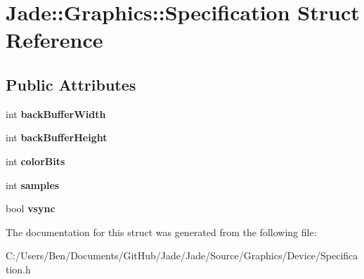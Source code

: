 \hypertarget{struct_jade_1_1_graphics_1_1_specification}{}\section{Jade\+:\+:Graphics\+:\+:Specification Struct Reference}
\label{struct_jade_1_1_graphics_1_1_specification}
\subsection*{Public Attributes}
\begin{DoxyCompactItemize}
\item 
\hypertarget{struct_jade_1_1_graphics_1_1_specification_a76947e56f89284a056142d36549925d1}{}int {\bfseries back\+Buffer\+Width}\label{struct_jade_1_1_graphics_1_1_specification_a76947e56f89284a056142d36549925d1}

\item 
\hypertarget{struct_jade_1_1_graphics_1_1_specification_af66492f2015f718021e8a43a389bfb53}{}int {\bfseries back\+Buffer\+Height}\label{struct_jade_1_1_graphics_1_1_specification_af66492f2015f718021e8a43a389bfb53}

\item 
\hypertarget{struct_jade_1_1_graphics_1_1_specification_a7c86964edc5f3923a7658b561f4d6bb4}{}int {\bfseries color\+Bits}\label{struct_jade_1_1_graphics_1_1_specification_a7c86964edc5f3923a7658b561f4d6bb4}

\item 
\hypertarget{struct_jade_1_1_graphics_1_1_specification_ad941863bb47f1069f04afe226d1007d0}{}int {\bfseries samples}\label{struct_jade_1_1_graphics_1_1_specification_ad941863bb47f1069f04afe226d1007d0}

\item 
\hypertarget{struct_jade_1_1_graphics_1_1_specification_ab1c4c9ce465199a05169cb9404b76811}{}bool {\bfseries vsync}\label{struct_jade_1_1_graphics_1_1_specification_ab1c4c9ce465199a05169cb9404b76811}

\end{DoxyCompactItemize}


The documentation for this struct was generated from the following file\+:\begin{DoxyCompactItemize}
\item 
C\+:/\+Users/\+Ben/\+Documents/\+Git\+Hub/\+Jade/\+Jade/\+Source/\+Graphics/\+Device/Specification.\+h\end{DoxyCompactItemize}
